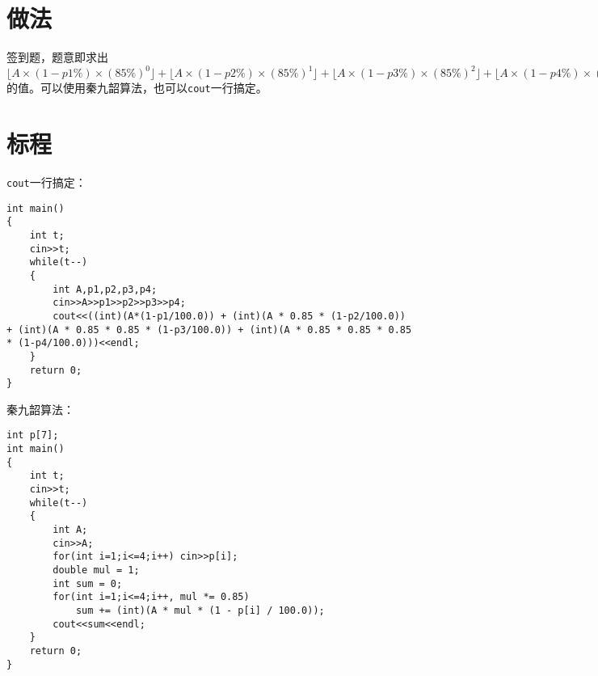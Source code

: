 \documentclass[
	lang=cn,
	color=blue
]{elegantbook}
\begin{document}
\section*{做法}
签到题，题意即求出$\lfloor A \times (1-p1\%) \times (85\%)^0 \rfloor + \lfloor A \times (1-p2\%) \times (85\%)^1 \rfloor + \lfloor A \times (1-p3\%) \times (85\%)^2 \rfloor + \lfloor A \times (1-p4\%) \times (85\%)^3 \rfloor$的值。可以使用秦九韶算法，也可以\lstinline{cout}一行搞定。

\section*{标程}
\lstinline{cout}一行搞定：
\begin{lstlisting}
int main()
{
    int t;
    cin>>t;
    while(t--)
    {
        int A,p1,p2,p3,p4;
        cin>>A>>p1>>p2>>p3>>p4;
        cout<<((int)(A*(1-p1/100.0)) + (int)(A * 0.85 * (1-p2/100.0)) + (int)(A * 0.85 * 0.85 * (1-p3/100.0)) + (int)(A * 0.85 * 0.85 * 0.85 * (1-p4/100.0)))<<endl;
    }
    return 0;
}
\end{lstlisting}

秦九韶算法：
\begin{lstlisting}
int p[7];
int main()
{
    int t;
    cin>>t;
    while(t--)
    {
        int A;
        cin>>A;
        for(int i=1;i<=4;i++) cin>>p[i];
        double mul = 1;
        int sum = 0;
        for(int i=1;i<=4;i++, mul *= 0.85)
            sum += (int)(A * mul * (1 - p[i] / 100.0));
        cout<<sum<<endl;
    }
    return 0;
}
\end{lstlisting}
\end{document}
